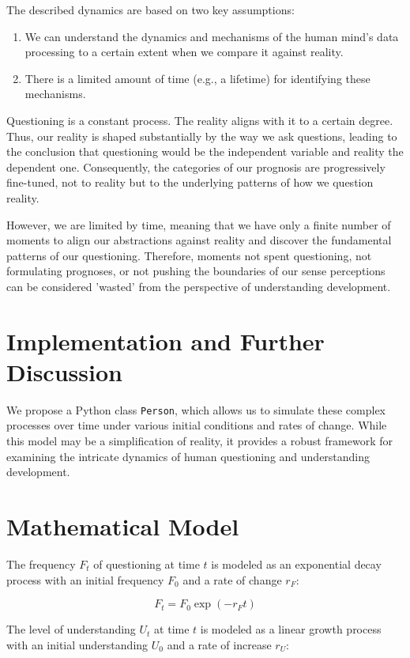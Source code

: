 \documentclass{article}
\begin{document}
The described dynamics are based on two key assumptions:
\begin{enumerate}
    \item We can understand the dynamics and mechanisms of the human mind's data processing to a certain extent when we compare it against reality.
    \item There is a limited amount of time (e.g., a lifetime) for identifying these mechanisms.
\end{enumerate}

Questioning is a constant process. The reality aligns with it to a certain degree. Thus, our reality is shaped substantially by the way we ask questions, leading to the conclusion that questioning would be the independent variable and reality the dependent one. Consequently, the categories of our prognosis are progressively fine-tuned, not to reality but to the underlying patterns of how we question reality.

However, we are limited by time, meaning that we have only a finite number of moments to align our abstractions against reality and discover the fundamental patterns of our questioning. Therefore, moments not spent questioning, not formulating prognoses, or not pushing the boundaries of our sense perceptions can be considered 'wasted' from the perspective of understanding development.

\section{Implementation and Further Discussion}

We propose a Python class \texttt{Person}, which allows us to simulate these complex processes over time under various initial conditions and rates of change. While this model may be a simplification of reality, it provides a robust framework for examining the intricate dynamics of human questioning and understanding development.

\section{Mathematical Model}

The frequency $F_t$ of questioning at time $t$ is modeled as an exponential decay process with an initial frequency $F_0$ and a rate of change $r_F$:

\[
F_t = F_0 \exp(-r_F t)
\]

The level of understanding $U_t$ at time $t$ is modeled as a linear growth process with an initial understanding $U_0$ and a rate of increase $r_U$:
\end{document}
